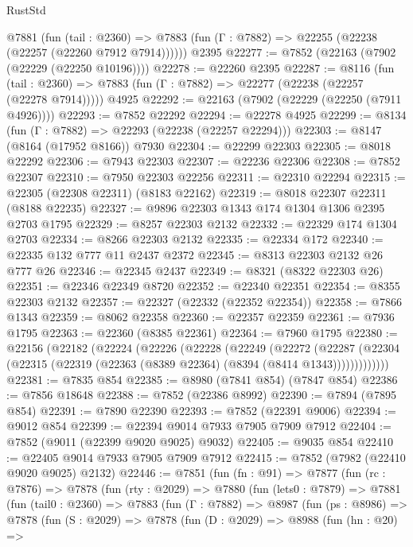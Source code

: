\begin{lexlean}{RustStd}
\begin{coremodule}
    @7881
      (fun (tail : @2360) =>
      @7883 (fun (Γ : @7882) => @22255 (@22238 (@22257 (@22260 @7912 @7914))))))
    @2395
@22277 := @7852 (@22163 (@7902 (@22229 (@22250 @10196))))
@22278 := @22260 @2395
@22287 := @8116
    (fun (tail : @2360) => @7883 (fun (Γ : @7882) => @22277 (@22238 (@22257 (@22278 @7914)))))
    @4925
@22292 := @22163 (@7902 (@22229 (@22250 (@7911 @4926))))
@22293 := @7852 @22292
@22294 := @22278 @4925
@22299 := @8134 (fun (Γ : @7882) => @22293 (@22238 (@22257 @22294)))
@22303 := @8147 (@8164 (@17952 @8166)) @7930
@22304 := @22299 @22303
@22305 := @8018 @22292
@22306 := @7943 @22303
@22307 := @22236 @22306
@22308 := @7852 @22307
@22310 := @7950 @22303 @22256
@22311 := @22310 @22294
@22315 := @22305 (@22308 @22311) (@8183 @22162)
@22319 := @8018 @22307 @22311 (@8188 @22235)
@22327 := @9896 @22303 @1343 @174 @1304 @1306 @2395 @2703 @1795
@22329 := @8257 @22303 @2132
@22332 := @22329 @174 @1304 @2703
@22334 := @8266 @22303 @2132
@22335 := @22334 @172
@22340 := @22335 @132 @777 @11 @2437 @2372
@22345 := @8313 @22303 @2132 @26 @777 @26
@22346 := @22345 @2437
@22349 := @8321 (@8322 @22303 @26)
@22351 := @22346 @22349 @8720
@22352 := @22340 @22351
@22354 := @8355 @22303 @2132
@22357 := @22327 (@22332 (@22352 @22354))
@22358 := @7866 @1343
@22359 := @8062 @22358
@22360 := @22357 @22359
@22361 := @7936 @1795
@22363 := @22360 (@8385 @22361)
@22364 := @7960 @1795
@22380 := @22156
    (@22182
      (@22224
        (@22226
          (@22228
            (@22249
              (@22272
                (@22287
                  (@22304 (@22315 (@22319 (@22363 (@8389 @22364) (@8394 (@8414 @1343)))))))))))))
@22381 := @7835 @854
@22385 := @8980 (@7841 @854) (@7847 @854)
@22386 := @7856 @18648
@22388 := @7852 (@22386 @8992)
@22390 := @7894 (@7895 @854)
@22391 := @7890 @22390
@22393 := @7852 (@22391 @9006)
@22394 := @9012 @854
@22399 := @22394 @9014 @7933 @7905 @7909 @7912
@22404 := @7852 (@9011 (@22399 @9020 @9025) @9032)
@22405 := @9035 @854
@22410 := @22405 @9014 @7933 @7905 @7909 @7912
@22415 := @7852 (@7982 (@22410 @9020 @9025) @2132)
@22446 := @7851
    (fun (fn : @91) =>
    @7877
      (fun (rc : @7876) =>
      @7878
        (fun (rty : @2029) =>
        @7880
          (fun (lets0 : @7879) =>
          @7881
            (fun (tail0 : @2360) =>
            @7883
              (fun (Γ : @7882) =>
              @8987
                (fun (ps : @8986) =>
                @7878
                  (fun (S : @2029) =>
                  @7878
                    (fun (D : @2029) =>
                    @8988
                      (fun (hn : @20) =>

\end{coremodule}
\end{lexlean}
